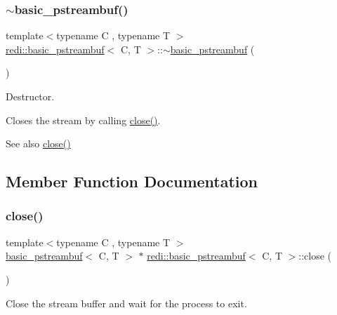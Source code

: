 \subsubsection{\texorpdfstring{$\sim$basic\+\_\+pstreambuf()}{~basic\_pstreambuf()}}
{\footnotesize\ttfamily template$<$typename C , typename T $>$ \\
\mbox{\hyperlink{classredi_1_1basic__pstreambuf}{redi\+::basic\+\_\+pstreambuf}}$<$ C, T $>$\+::$\sim$\mbox{\hyperlink{classredi_1_1basic__pstreambuf}{basic\+\_\+pstreambuf}} (\begin{DoxyParamCaption}{ }\end{DoxyParamCaption})\hspace{0.3cm}{\ttfamily [inline]}}



Destructor. 

Closes the stream by calling \mbox{\hyperlink{classredi_1_1basic__pstreambuf_a725edcfa569034899d63312fa8d98791}{close()}}.

\begin{DoxySeeAlso}{See also}
\mbox{\hyperlink{classredi_1_1basic__pstreambuf_a725edcfa569034899d63312fa8d98791}{close()}} 
\end{DoxySeeAlso}


\subsection{Member Function Documentation}
\mbox{\label{classredi_1_1basic__pstreambuf_a725edcfa569034899d63312fa8d98791}} 
\subsubsection{\texorpdfstring{close()}{close()}}
{\footnotesize\ttfamily template$<$typename C , typename T $>$ \\
\mbox{\hyperlink{classredi_1_1basic__pstreambuf}{basic\+\_\+pstreambuf}}$<$ C, T $>$ $\ast$ \mbox{\hyperlink{classredi_1_1basic__pstreambuf}{redi\+::basic\+\_\+pstreambuf}}$<$ C, T $>$\+::close (\begin{DoxyParamCaption}{ }\end{DoxyParamCaption})}



Close the stream buffer and wait for the process to exit. 

